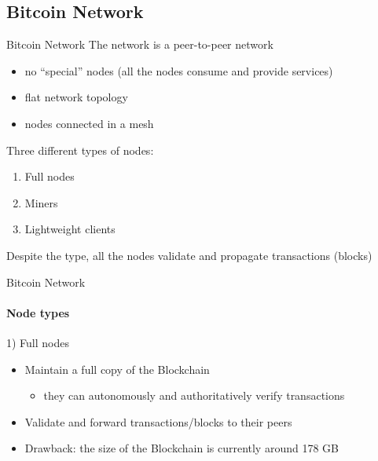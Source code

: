 \documentclass{beamer}
\begin{document}
  \subsection{Bitcoin Network}
  \begin{frame}{Bitcoin Network}
    The network is a peer-to-peer network
    \begin{itemize}
        \item no ``special'' nodes (all the nodes consume and provide services) 
        \item flat network topology
        \item nodes connected in a mesh
    \end{itemize}
    
    Three different types of nodes:
    \begin{enumerate}
        \item Full nodes
        \item Miners
        \item Lightweight clients
    \end{enumerate}
    
    Despite the type, all the nodes validate and propagate transactions (blocks)
  \end{frame}
  
  
  
  
  \begin{frame}{Bitcoin Network}
    \framesubtitle{Node types}
    \begin{block}{1) Full nodes}
        \begin{itemize}
            \item Maintain a full copy of the Blockchain
            \begin{itemize}
                \item[\MVRightarrow] they can autonomously and authoritatively verify transactions
            \end{itemize}
            \item Validate and forward transactions/blocks to their peers 
            \item Drawback: the size of the Blockchain is currently around 178 GB \cite{statista}
        \end{itemize}
    \end{block}
  \end{frame}
  
  
  
\end{document}
